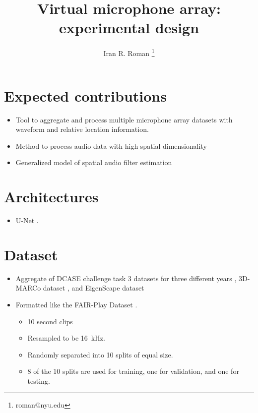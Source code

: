 \documentclass[14pt]{extarticle}
\title{Virtual microphone array: experimental design}
\author{Iran R. Roman \thanks{roman@nyu.edu}}
\affil{Music and Audio Research Laboratory, New York University}
\date{}
\begin{document}

\maketitle
\tableofcontents

\vspace{.25in}


\section{Expected contributions}

\begin{itemize}

\item Tool to aggregate and process multiple microphone array datasets with waveform and relative location information.

\item Method to process audio data with high spatial dimensionality

\item Generalized model of spatial audio filter estimation

\end{itemize}

\section{Architectures}

\begin{itemize}

\item U-Net \cite{gao20192}.

\end{itemize}

\section{Dataset}

\begin{itemize}

\item Aggregate of DCASE challenge task 3 datasets for three different years \cite{adavanne2019multi, politis2020dataset, politis2021tau}, 3D-MARCo dataset \cite{lee3d}, and EigenScape dataset \cite{green2017eigenscape}

\item Formatted like the FAIR-Play Dataset \cite{gao2019visualsound}.

	\begin{itemize}
	\item 10 second clips
	\item Resampled to be \SI{16}{\kilo\hertz}.
	\item Randomly separated into 10 splits of equal size.
	\item 8 of the 10 splits are used for training, one for validation, and one for testing. 
	\end{itemize}


\end{itemize}
\end{document}
